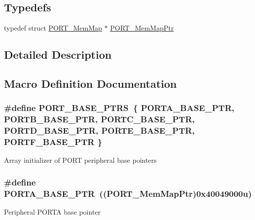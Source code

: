 \subsection*{Typedefs}
\begin{DoxyCompactItemize}
\item 
typedef struct \hyperlink{struct_p_o_r_t___mem_map}{P\+O\+R\+T\+\_\+\+Mem\+Map} $\ast$ \hyperlink{group___p_o_r_t___peripheral_ga0e26bafb7c17808f90278627bcbcaf8c}{P\+O\+R\+T\+\_\+\+Mem\+Map\+Ptr}
\end{DoxyCompactItemize}


\subsection{Detailed Description}


\subsection{Macro Definition Documentation}
\hypertarget{group___p_o_r_t___peripheral_ga54ff5179f8acaef2e1683cedfc0ef453}{}
\subsubsection[{P\+O\+R\+T\+\_\+\+B\+A\+S\+E\+\_\+\+P\+T\+R\+S}]{\setlength{\rightskip}{0pt plus 5cm}\#define P\+O\+R\+T\+\_\+\+B\+A\+S\+E\+\_\+\+P\+T\+R\+S~\{ {\bf P\+O\+R\+T\+A\+\_\+\+B\+A\+S\+E\+\_\+\+P\+T\+R}, {\bf P\+O\+R\+T\+B\+\_\+\+B\+A\+S\+E\+\_\+\+P\+T\+R}, {\bf P\+O\+R\+T\+C\+\_\+\+B\+A\+S\+E\+\_\+\+P\+T\+R}, {\bf P\+O\+R\+T\+D\+\_\+\+B\+A\+S\+E\+\_\+\+P\+T\+R}, {\bf P\+O\+R\+T\+E\+\_\+\+B\+A\+S\+E\+\_\+\+P\+T\+R}, {\bf P\+O\+R\+T\+F\+\_\+\+B\+A\+S\+E\+\_\+\+P\+T\+R} \}}\label{group___p_o_r_t___peripheral_ga54ff5179f8acaef2e1683cedfc0ef453}
Array initializer of P\+O\+R\+T peripheral base pointers \hypertarget{group___p_o_r_t___peripheral_gaa18ec7594fe603225220ec6eda4a19ce}{}
\subsubsection[{P\+O\+R\+T\+A\+\_\+\+B\+A\+S\+E\+\_\+\+P\+T\+R}]{\setlength{\rightskip}{0pt plus 5cm}\#define P\+O\+R\+T\+A\+\_\+\+B\+A\+S\+E\+\_\+\+P\+T\+R~(({\bf P\+O\+R\+T\+\_\+\+Mem\+Map\+Ptr})0x40049000u)}\label{group___p_o_r_t___peripheral_gaa18ec7594fe603225220ec6eda4a19ce}
Peripheral P\+O\+R\+T\+A base pointer \hypertarget{group___p_o_r_t___peripheral_ga585b4782d1ceb44492289af0019480f9}{}

